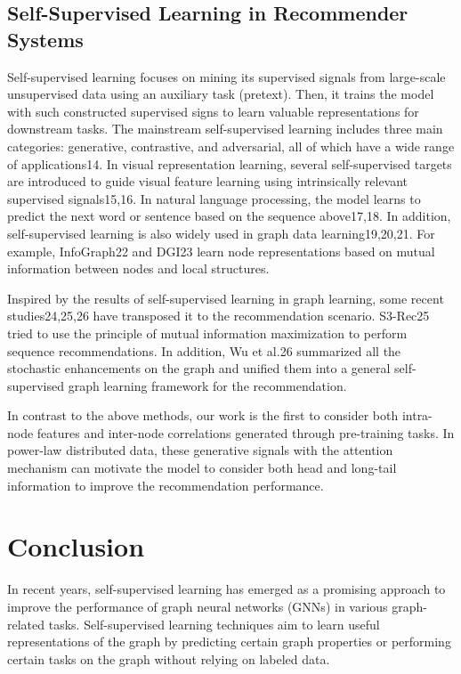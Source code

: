 \documentclass[a4paper,11pt]{report}
\begin{document}
\section{Self-Supervised Learning in Recommender Systems}\label{AA}
Self-supervised learning focuses on mining its supervised signals from large-scale unsupervised data using an auxiliary task (pretext). Then, it trains the model with such constructed supervised signs to learn valuable representations for downstream tasks. The mainstream self-supervised learning includes three main categories: generative, contrastive, and adversarial, all of which have a wide range of applications14. In visual representation learning, several self-supervised targets are introduced to guide visual feature learning using intrinsically relevant supervised signals15,16. In natural language processing, the model learns to predict the next word or sentence based on the sequence above17,18. In addition, self-supervised learning is also widely used in graph data learning19,20,21. For example, InfoGraph22 and DGI23 learn node representations based on mutual information between nodes and local structures.

Inspired by the results of self-supervised learning in graph learning, some recent studies24,25,26 have transposed it to the recommendation scenario. S3-Rec25 tried to use the principle of mutual information maximization to perform sequence recommendations. In addition, Wu et al.26 summarized all the stochastic enhancements on the graph and unified them into a general self-supervised graph learning framework for the recommendation.

In contrast to the above methods, our work is the first to consider both intra-node features and inter-node correlations generated through pre-training tasks. In power-law distributed data, these generative signals with the attention mechanism can motivate the model to consider both head and long-tail information to improve the recommendation performance.

\chapter{Conclusion}
In recent years, self-supervised learning has emerged as a promising approach to improve the performance of graph neural networks (GNNs) in various graph-related tasks. Self-supervised learning techniques aim to learn useful representations of the graph by predicting certain graph properties or performing certain tasks on the graph without relying on labeled data.
\end{document}
